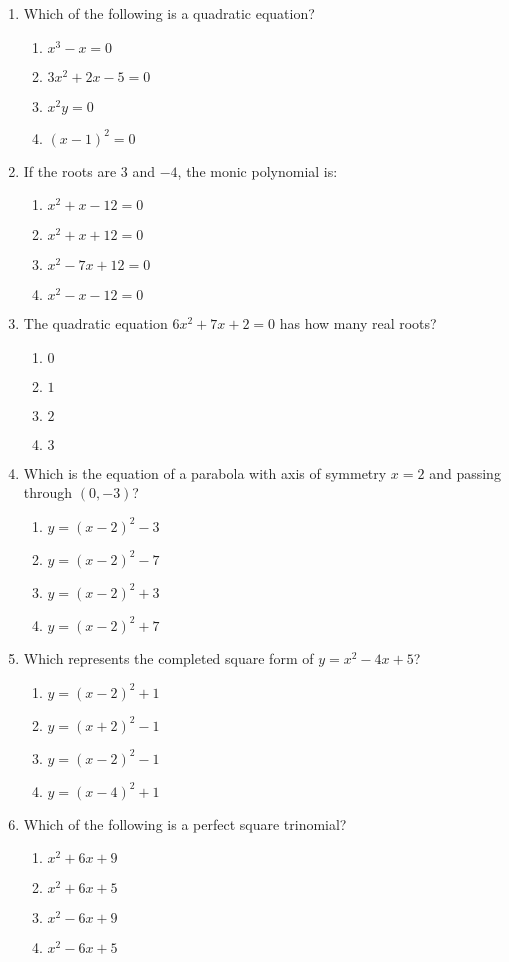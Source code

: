 \documentclass[12pt]{article}
\begin{document}
\begin{enumerate}
\item Which of the following is a quadratic equation?

\begin{enumerate}
  \item \(x^3 - x = 0\)
  \item \(3x^2 + 2x - 5 = 0\)
  \item \(x^2y = 0\)
  \item \((x - 1)^2 = 0\)
\end{enumerate}

\item If the roots are \(3\) and \(-4\), the monic polynomial is:

\begin{enumerate}
  \item \(x^2 + x - 12 = 0\)
  \item \(x^2 + x + 12 = 0\)
  \item \(x^2 - 7x + 12 = 0\)
  \item \(x^2 - x - 12 = 0\)
\end{enumerate}

\item The quadratic equation \(6x^2 + 7x + 2 = 0\) has how many real roots?

\begin{enumerate}
  \item \(0\)
  \item \(1\)
  \item \(2\)
  \item \(3\)
\end{enumerate}

\item Which is the equation of a parabola with axis of symmetry \(x = 2\) and passing through \((0,-3)\)?

\begin{enumerate}
  \item \(y = (x-2)^2 - 3\)
  \item \(y = (x-2)^2 - 7\)
  \item \(y = (x-2)^2 + 3\)
  \item \(y = (x-2)^2 + 7\)
\end{enumerate}

\item Which represents the completed square form of \(y = x^2 - 4x + 5\)?

\begin{enumerate}
  \item \(y = (x-2)^2 + 1\)
  \item \(y = (x+2)^2 - 1\)
  \item \(y = (x-2)^2 - 1\)
  \item \(y = (x-4)^2 + 1\)
\end{enumerate}

\item Which of the following is a perfect square trinomial?

\begin{enumerate}
  \item \(x^2 + 6x + 9\)
  \item \(x^2 + 6x + 5\)
  \item \(x^2 - 6x + 9\)
  \item \(x^2 - 6x + 5\)
\end{enumerate}

\end{enumerate}
\end{document}

